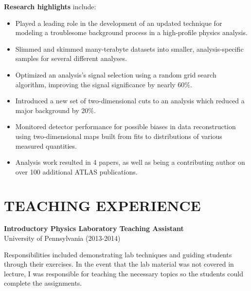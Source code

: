 \documentclass[10pt]{res}
\begin{document}
\begin{resume}

    {\bf Research highlights} include:
    \begin{itemize}
    \item Played a leading role in the development of an updated technique for modeling a troublesome background process in a high-profile physics analysis.
    \item Slimmed and skimmed many-terabyte datasets into smaller, analysis-specific samples for several different analyses.
    \item Optimized an analysis's signal selection using a random grid search algorithm, improving the signal significance by nearly 60\%.
    \item Introduced a new set of two-dimensional cuts to an analysis which reduced a major background by 20\%.
    \item Monitored detector performance for possible biases in data reconstruction using two-dimensional maps built from fits to distributions of various measured quantities.
    \item Analysis work resulted in 4 papers, as well as being a contributing author on over 100 additional ATLAS publications.
    \end{itemize}

\section{TEACHING EXPERIENCE}%
    {\bf Introductory Physics Laboratory Teaching Assistant}\\
    University of Pennsylvania (2013-2014)

    Responsibilities included demonstrating lab techniques and guiding students through their exercises.  In the event that the lab material was not covered in lecture, I was responsible for teaching the necessary topics so the students could complete the assignments.
\newpage

\end{resume}
\end{document}
